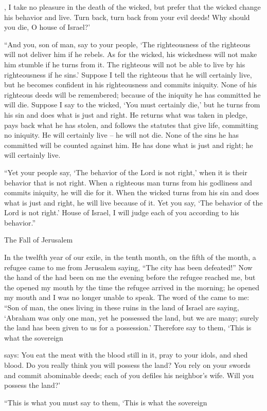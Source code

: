 {{}, I take no pleasure
in the death
of the wicked,
but prefer that
the wicked
change
his behavior
and live.
Turn back,
turn back
from your evil
deeds! Why
should you die,
O house
of Israel?’
\par }{\PP {}“And you,
son
of man,
say
to
your people, ‘The righteousness
of the righteous
will not
deliver
him if he rebels.
As for the wicked,
his wickedness
will not
make him stumble
if he turns from
it.
The righteous
will not
be able
to live
by his righteousness
if he sins.’
Suppose I tell
the righteous
that he
will certainly
live,
but he
becomes confident
in his righteousness
and commits
iniquity.
None
of his righteous
deeds will be remembered;
because of the iniquity
he has
committed
he will die.
Suppose I say
to the wicked,
‘You must certainly
die,’
but he turns from
his sin
and does
what is just
and right.
He returns
what was taken in pledge,
pays
back what he has stolen,
and follows the statutes
that give life,
committing
no iniquity.
He will certainly
live
– he will not
die.
None
of the sins
he has
committed
will be counted
against him. He has done
what is just
and right;
he will certainly
live.
\par }{\PP {}“Yet
your people
say,
‘The behavior
of the Lord
is
not right,’ when it is
their
behavior that is
not
right.
When a righteous
man turns from his godliness
and commits
iniquity,
he will die for it.
When
the wicked
turns from his sin and does
what is just
and right,
he
will live because of it.
Yet you say,
‘The behavior
of the Lord
is not
right.’ House
of Israel,
I will judge
each
of you according to his behavior.”
\par }{\SH The Fall of Jerusalem
\par }{\PP {}In the twelfth
year
of our exile,
in the tenth
month, on the fifth
of the month,
a refugee
came
to me
from Jerusalem
saying,
“The city
has been defeated!”
Now the hand
of the {}
had been
on
me the evening
before
the refugee
reached
me, but the
{} opened
my mouth
by the time the refugee arrived
in
the morning;
he opened
my mouth
and I was no
longer
unable to speak.
The word
of the {}
came to me:
“Son
of man,
the ones living
in these
ruins
in the land
of Israel
are saying,
‘Abraham
was
only one
man, yet he possessed
the
land,
but we
are many;
surely the land
has been given
to us for a possession.’
Therefore
say
to
them, ‘This is what
the sovereign

{}
says: You eat
the meat with the blood
still in it, pray
to
your idols,
and shed
blood.
Do you really think you will possess
the land?
You rely
on
your swords
and commit
abominable deeds;
each
of you defiles
his neighbor’s
wife.
Will you possess
the land?’
\par }{\PP {}“This is what
you must say
to
them, ‘This is what
the sovereign

}
